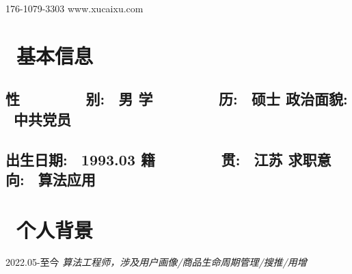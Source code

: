 \documentclass{resume}
\begin{document}











\medskip

    {176-1079-3303}    {www.xucaixu.com} 










\section{   \faListAlt  \  基本信息}
   \subsection{  \hspace{ 0.4cm }     \textbf{性\ \ \ \ \ \ \ \ 别}:    \ 男   
                        \hspace{ 3.2cm }     \textbf{学\ \ \ \ \ \ \ \ 历}:   \ 硕士 
                        \hspace{ 3.2cm }     \textbf{政治面貌}: \ 中共党员 }

   \subsection{  \hspace{ 0.4cm }     \textbf{出生日期}:     \ 1993.03
                        \hspace{ 2.25cm }     \textbf{籍\ \ \ \ \ \ \ \ 贯}:     \ 江苏
                        \hspace{ 3.2cm }     \textbf{求职意向}:  \ 算法应用 }

\medskip











\section{   \faUser    \  个人背景}

                                                  {2022.05-至今}
   \faUserMd   \textit{   算法工程师，涉及用户画像/商品生命周期管理/搜推/用增 }
\end{document}
